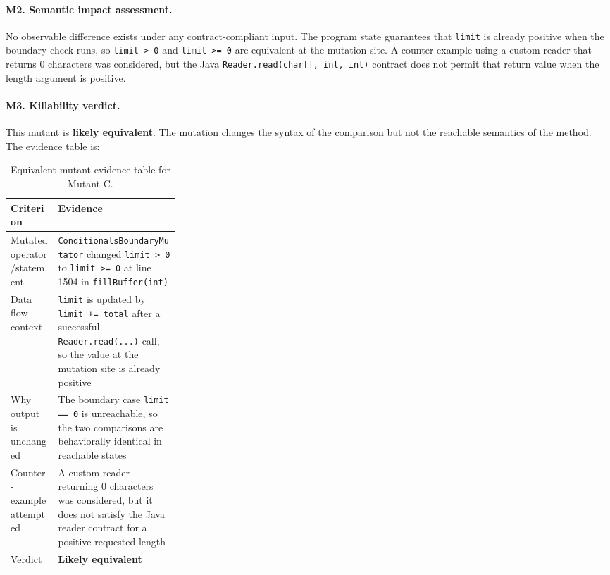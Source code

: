 \documentclass[11pt]{article}
\begin{document}
\paragraph{M2. Semantic impact assessment.}
No observable difference exists under any contract-compliant input. The program state guarantees that \texttt{limit} is already positive when the boundary check runs, so \texttt{limit > 0} and \texttt{limit >= 0} are equivalent at the mutation site. A counter-example using a custom reader that returns 0 characters was considered, but the Java \texttt{Reader.read(char[], int, int)} contract does not permit that return value when the length argument is positive.

\paragraph{M3. Killability verdict.}
This mutant is \textbf{likely equivalent}. The mutation changes the syntax of the comparison but not the reachable semantics of the method. The evidence table is:

\begin{table}[H]
\centering
\small
\begin{tabularx}{\linewidth}{>{\raggedright\arraybackslash}p{0.28\linewidth}X}
\toprule
Criterion & Evidence \\
\midrule
Mutated operator/statement & \texttt{ConditionalsBoundaryMutator} changed \texttt{limit > 0} to \texttt{limit >= 0} at line 1504 in \texttt{fillBuffer(int)} \\
Data flow context & \texttt{limit} is updated by \texttt{limit += total} after a successful \texttt{Reader.read(...)} call, so the value at the mutation site is already positive \\
Why output is unchanged & The boundary case \texttt{limit == 0} is unreachable, so the two comparisons are behaviorally identical in reachable states \\
Counter-example attempted & A custom reader returning 0 characters was considered, but it does not satisfy the Java reader contract for a positive requested length \\
Verdict & \textbf{Likely equivalent} \\
\bottomrule
\end{tabularx}
\caption{Equivalent-mutant evidence table for Mutant C.}
\end{table}
\end{document}
